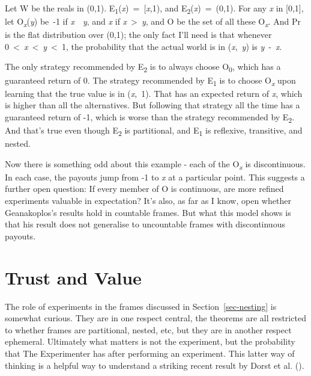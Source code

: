 \documentclass[
  12pt,
  letterpaper,
  DIV=11,
  numbers=noendperiod]{scrartcl}
\begin{document}
Let W be the reals in (0,1).
E\textsubscript{1}(\emph{x})~=~{[}\emph{x},1), and
E\textsubscript{2}(\emph{x})~=~(0,1). For any \emph{x} in {[}0,1{]}, let
O\textsubscript{\emph{x}}(\emph{y}) be~-1 if \emph{x}~\geq~\emph{y}, and
\emph{x} if \emph{x}~\textgreater~\emph{y}, and O be the set of all
these O\textsubscript{\emph{x}}. And Pr is the flat distribution over
(0,1); the only fact I'll need is that whenever
0~\textless~\emph{x}~\textless~\emph{y}~\textless~1, the probability
that the actual world is in (\emph{x},~\emph{y}) is \emph{y}~-~\emph{x}.

The only strategy recommended by E\textsubscript{2} is to always choose
O\textsubscript{0}, which has a guaranteed return of 0. The strategy
recommended by E\textsubscript{1} is to choose O\textsubscript{\emph{x}}
upon learning that the true value is in (\emph{x},~1). That has an
expected return of \emph{x}, which is higher than all the alternatives.
But following that strategy all the time has a guaranteed return of -1,
which is worse than the strategy recommended by E\textsubscript{2}. And
that's true even though E\textsubscript{2} is partitional, and
E\textsubscript{1} is reflexive, transitive, and nested.

Now there is something odd about this example - each of the
O\textsubscript{\emph{x}} is discontinuous. In each case, the payouts
jump from -1 to \emph{x} at a particular point. This suggests a further
open question: If every member of O is continuous, are more refined
experiments valuable in expectation? It's also, as far as I know, open
whether Geanakoplos's results hold in countable frames. But what this
model shows is that his result does not generalise to uncountable frames
with discontinuous payouts.

\section{Trust and Value}\label{sec-dorst}

The role of experiments in the frames discussed in
Section~\ref{sec-nesting} is somewhat curious. They are in one respect
central, the theorems are all restricted to whether frames are
partitional, nested, etc, but they are in another respect ephemeral.
Ultimately what matters is not the experiment, but the probability that
The Experimenter has after performing an experiment. This latter way of
thinking is a helpful way to understand a striking recent result by
Dorst et al. ().
\end{document}
